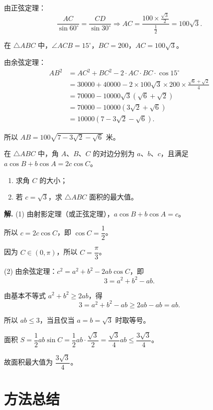 \documentclass[11pt]{ctexrep}
\begin{document}
由正弦定理：
\[
    \frac{AC}{\sin 60^{\circ}} = \frac{CD}{\sin 30^{\circ}} \Rightarrow AC = \frac{100 \times \frac{\sqrt{3}}{2}}{\frac{1}{2}} = 100\sqrt{3}.
\]

在 $\triangle ABC$ 中，$\angle ACB = 15^{\circ}$，$BC = 200$，$AC = 100\sqrt{3}$。

由余弦定理：
\begin{align*}
    AB^2 &= AC^2 + BC^2 - 2 \cdot AC \cdot BC \cdot \cos 15^{\circ} \\
    &= 30000 + 40000 - 2 \times 100\sqrt{3} \times 200 \times \frac{\sqrt{6} + \sqrt{2}}{4} \\
    &= 70000 - 10000\sqrt{3}(\sqrt{6} + \sqrt{2}) \\
    &= 70000 - 10000(3\sqrt{2} + \sqrt{6}) \\
    &= 10000(7 - 3\sqrt{2} - \sqrt{6}).
\end{align*}

所以 $AB = 100\sqrt{7 - 3\sqrt{2} - \sqrt{6}}$ 米。

\begin{realexam}[练习]
    在 $\triangle ABC$ 中，角 $A$、$B$、$C$ 的对边分别为 $a$、$b$、$c$，且满足 $a\cos B + b\cos A = 2c\cos C$。
    \begin{enumerate}
        \item 求角 $C$ 的大小；
        \item 若 $c = \sqrt{3}$，求 $\triangle ABC$ 面积的最大值。
    \end{enumerate}
\end{realexam}

\textbf{解.} (1) 由射影定理（或正弦定理），$a\cos B + b\cos A = c$。

所以 $c = 2c\cos C$，即 $\cos C = \dfrac{1}{2}$。

因为 $C \in (0, \pi)$，所以 $C = \dfrac{\pi}{3}$。

(2) 由余弦定理：$c^2 = a^2 + b^2 - 2ab\cos C$，即
\[
    3 = a^2 + b^2 - ab.
\]

由基本不等式 $a^2 + b^2 \geq 2ab$，得
\[
    3 = a^2 + b^2 - ab \geq 2ab - ab = ab.
\]

所以 $ab \leq 3$，当且仅当 $a = b = \sqrt{3}$ 时取等号。

面积 $S = \dfrac{1}{2}ab\sin C = \dfrac{1}{2}ab \cdot \dfrac{\sqrt{3}}{2} = \dfrac{\sqrt{3}}{4}ab \leq \dfrac{3\sqrt{3}}{4}$。

故面积最大值为 $\dfrac{3\sqrt{3}}{4}$。

\section*{方法总结}
\end{document}
